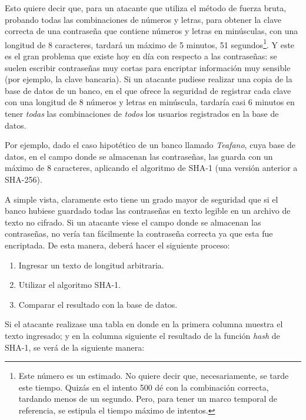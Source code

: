 \documentclass[12pt,a4paper,twoside]{book}
\begin{document}
Esto quiere decir que, para un atacante que utiliza el método de fuerza bruta, probando todas las combinaciones de números y letras, para obtener la clave correcta de una contraseña que contiene números y letras en minúsculas, con una longitud de 8 caracteres, tardará un máximo de 5 minutos, 51 segundos\footnote{Este número es un estimado. No quiere decir que, necesariamente, se tarde este tiempo. Quizás en el intento 500 dé con la combinación correcta, tardando menos de un segundo. Pero, para tener un marco temporal de referencia, se estipula el tiempo máximo de intentos.}. Y este es el gran problema que existe hoy en día con respecto a las contraseñas: se suelen escribir contraseñas muy cortas para encriptar información muy sensible (por ejemplo, la clave bancaria). Si un atacante pudiese realizar una copia de la base de datos de un banco, en el que ofrece la seguridad de registrar cada clave con una longitud de 8 números y letras en minúscula, tardaría casi 6 minutos en tener \textit{todas} las combinaciones de \textit{todos} los usuarios registrados en la base de datos.

Por ejemplo, dado el caso hipotético de un banco llamado \textit{Teafano}, cuya base de datos, en el campo donde se almacenan las contraseñas, las guarda con un máximo de 8 caracteres, aplicando el algoritmo de SHA-1 (una versión anterior a SHA-256).

A simple vista, claramente esto tiene un grado mayor de seguridad que si el banco hubiese guardado todas las contraseñas en texto legible en un archivo de texto no cifrado. Si un atacante viese el campo donde se almacenan las contraseñas, no vería tan fácilmente la contraseña correcta ya que esta fue encriptada. De esta manera, deberá hacer el siguiente proceso:

\begin{enumerate}
\item Ingresar un texto de longitud arbitraria.
\item Utilizar el algoritmo SHA-1.
\item Comparar el resultado con la base de datos.
\end{enumerate}

Si el atacante realizase una tabla en donde en la primera columna muestra el texto ingresado; y en la columna siguiente el resultado de la función \textit{hash} de SHA-1, se verá de la siguiente manera:
\end{document}
